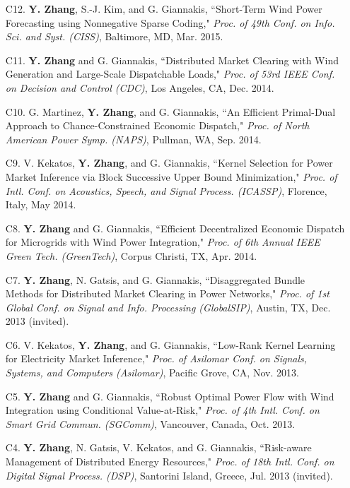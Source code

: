\documentclass[margin,line]{res}
\begin{document}
\begin{resume}
\begin{enumerate}
\item[C12.]	\textbf{Y. Zhang}, S.-J. Kim, and G. Giannakis,
``Short-Term Wind Power Forecasting using Nonnegative Sparse Coding,"
\emph{Proc. of 49th Conf. on Info. Sci. and Syst. (CISS)}, Baltimore, MD, Mar. 2015.

\item[C11.]	\textbf{Y. Zhang} and G. Giannakis,
``Distributed Market Clearing with Wind Generation and Large-Scale Dispatchable Loads,"
\emph{Proc. of 53rd IEEE Conf. on Decision and Control (CDC)}, Los Angeles, CA, Dec. 2014.

\item[C10.] G. Martinez, \textbf{Y. Zhang}, and G. Giannakis,
``An Efficient Primal-Dual Approach to Chance-Constrained Economic Dispatch,"
\emph{Proc. of North American Power Symp. (NAPS)}, Pullman, WA, Sep. 2014.

\item[C9.]	V. Kekatos, \textbf{Y. Zhang}, and G. Giannakis,
``Kernel Selection for Power Market Inference via Block Successive Upper Bound Minimization,"
\emph{Proc. of Intl. Conf. on Acoustics, Speech, and Signal Process. (ICASSP)},
Florence, Italy, May 2014.

\item[C8.]	\textbf{Y. Zhang} and G. Giannakis,
``Efficient Decentralized Economic Dispatch for Microgrids with Wind Power Integration,"
\emph{Proc. of 6th Annual IEEE Green Tech. (GreenTech)}, Corpus Christi, TX, Apr. 2014.

\item[C7.]	\textbf{Y. Zhang}, N. Gatsis, and G. Giannakis,
``Disaggregated Bundle Methods for Distributed Market Clearing in Power Networks,"
\emph{Proc. of 1st Global Conf. on Signal and Info. Processing (GlobalSIP)}, Austin, TX, Dec. 2013 (invited).

\item[C6.]	V. Kekatos, \textbf{Y. Zhang}, and G. Giannakis,
``Low-Rank Kernel Learning for Electricity Market Inference,"
\emph{Proc. of Asilomar Conf. on Signals, Systems, and Computers (Asilomar)}, Pacific Grove, CA, Nov. 2013.

\item[C5.]	\textbf{Y. Zhang} and G. Giannakis,
``Robust Optimal Power Flow with Wind Integration using Conditional Value-at-Risk,"
\emph{Proc. of 4th Intl. Conf. on Smart Grid Commun. (SGComm)}, Vancouver, Canada, Oct. 2013.

\item[C4.]	\textbf{Y. Zhang}, N. Gatsis, V. Kekatos, and G. Giannakis,
``Risk-aware Management of Distributed Energy Resources,"
\emph{Proc. of 18th Intl. Conf. on Digital Signal Process. (DSP)}, Santorini Island, Greece, Jul. 2013 (invited).


\end{enumerate}
\end{resume}
\end{document}
